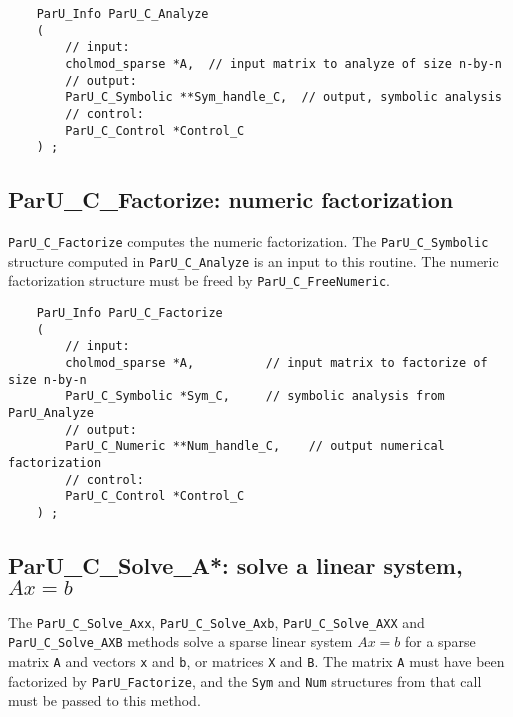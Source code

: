 \documentclass[12pt]{article}
\begin{document}
    {\footnotesize
    \begin{verbatim}
    ParU_Info ParU_C_Analyze
    (
        // input:
        cholmod_sparse *A,  // input matrix to analyze of size n-by-n
        // output:
        ParU_C_Symbolic **Sym_handle_C,  // output, symbolic analysis
        // control:
        ParU_C_Control *Control_C
    ) ; \end{verbatim} }

\subsection{{\sf ParU\_C\_Factorize}: numeric factorization}

    \verb'ParU_C_Factorize' computes the numeric factorization.  The
    \verb'ParU_C_Symbolic' structure computed in \verb'ParU_C_Analyze' is an
    input to this routine.  The numeric factorization structure must be freed
    by \verb'ParU_C_FreeNumeric'.

    {\footnotesize
    \begin{verbatim}
    ParU_Info ParU_C_Factorize
    (
        // input:
        cholmod_sparse *A,          // input matrix to factorize of size n-by-n
        ParU_C_Symbolic *Sym_C,     // symbolic analysis from ParU_Analyze
        // output:
        ParU_C_Numeric **Num_handle_C,    // output numerical factorization
        // control:
        ParU_C_Control *Control_C
    ) ; \end{verbatim} }

\subsection{{\sf ParU\_C\_Solve\_A*}: solve a linear system, $Ax=b$}

    The \verb'ParU_C_Solve_Axx',  \verb'ParU_C_Solve_Axb',
    \verb'ParU_C_Solve_AXX' and \verb'ParU_C_Solve_AXB' methods solve a sparse
    linear system $Ax=b$ for a sparse matrix \verb'A' and vectors \verb'x' and
    \verb'b', or matrices \verb'X' and \verb'B'.  The matrix \verb'A' must have
    been factorized by \verb'ParU_Factorize', and the \verb'Sym' and \verb'Num'
    structures from that call must be passed to this method.
\end{document}

